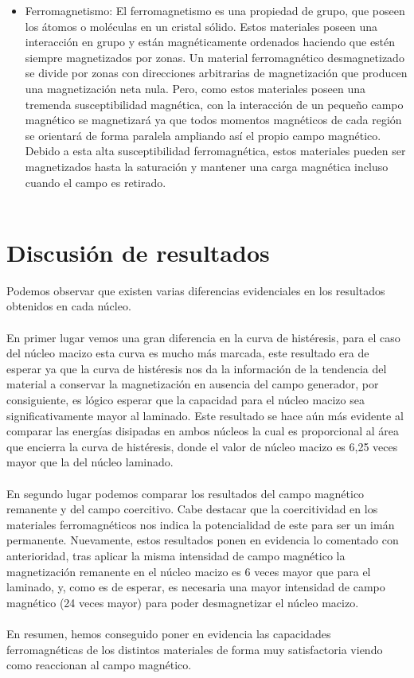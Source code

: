 \documentclass[11pt,letterpaper,twocolumn]{article}
\begin{document}
\begin{itemize}
\item Ferromagnetismo: El ferromagnetismo es una propiedad de grupo, que poseen los átomos o moléculas en un cristal sólido. Estos materiales poseen una interacción en grupo y están magnéticamente ordenados haciendo que estén siempre magnetizados por zonas. Un material ferromagnético desmagnetizado se divide por zonas con direcciones arbitrarias de magnetización que producen una magnetización neta nula. Pero, como estos materiales poseen una tremenda susceptibilidad magnética, con la interacción de un pequeño campo magnético se magnetizará ya que todos momentos magnéticos de cada región se orientará de forma paralela ampliando así el propio campo magnético. Debido a esta alta susceptibilidad ferromagnética, estos materiales pueden ser magnetizados hasta la saturación y mantener una carga magnética incluso cuando el campo es retirado.\\
\\
\end{itemize}
\section{Discusión de resultados}%
\label{sec}
Podemos observar que existen varias diferencias evidenciales en los resultados obtenidos en cada núcleo.\\
\\
En primer lugar vemos una gran diferencia en la curva de histéresis, para el caso del núcleo macizo esta curva es mucho más marcada, este resultado era de esperar ya que la curva de histéresis nos da la información de la tendencia del material a conservar la magnetización en ausencia del campo generador, por consiguiente, es lógico esperar que la capacidad para el núcleo macizo sea significativamente mayor al laminado.  Este resultado se hace aún más evidente al comparar las energías disipadas en ambos núcleos la cual es proporcional al área que encierra la curva de histéresis, donde el valor de núcleo macizo es 6,25 veces mayor que la del núcleo laminado.\\
\\
En segundo lugar podemos comparar los resultados del campo magnético remanente y del campo coercitivo. Cabe destacar que la coercitividad en los materiales ferromagnéticos nos indica la potencialidad de este para ser un imán permanente. Nuevamente, estos resultados ponen en evidencia lo comentado con anterioridad, tras aplicar la misma intensidad de campo magnético la magnetización remanente en el núcleo macizo es 6 veces mayor que para el laminado, y, como es de esperar, es necesaria una mayor intensidad de campo magnético (24 veces mayor) para poder desmagnetizar el núcleo macizo. \\
\\
En resumen, hemos conseguido poner en evidencia las capacidades ferromagnéticas de los distintos materiales de forma muy satisfactoria viendo como reaccionan al campo magnético.
\end{document}
